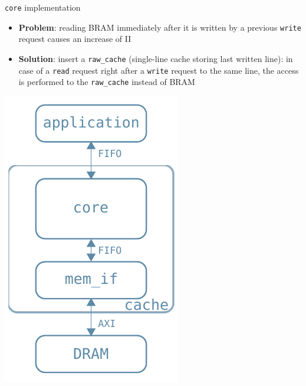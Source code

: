 \documentclass{beamer}
\begin{document}
\begin{frame}{\texttt{core} implementation}
	\begin{minipage}{.7\textwidth}
		\begin{itemize}
			\item \textbf{Problem}:
				reading BRAM immediately after it is written by
				a previous \texttt{write} request causes an
				increase of II
			\item \textbf{Solution}:
				insert a \texttt{raw\_cache} (single-line
				cache storing last written line): in case of a
				\texttt{read} request right after a \texttt{write}
				request to the same line, the access is performed
				to the \texttt{raw\_cache} instead of BRAM
		\end{itemize}
	\end{minipage}
	\begin{minipage}{.29\textwidth}
		\begin{center}
			\includegraphics[width=.9\textwidth,height=.9\textheight,keepaspectratio]{internal_arch.pdf}
		\end{center}
	\end{minipage}
\end{frame}
\end{document}
